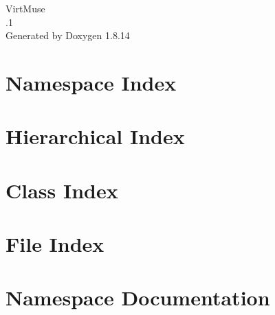 \documentclass[twoside]{book}
\newcommand{\+}{\discretionary{\mbox{\scriptsize$\hookleftarrow$}}{}{}}
\newcommand{\clearemptydoublepage}{%
  \newpage{\pagestyle{empty}\cleardoublepage}%
}
\begin{document}
\hypersetup{pageanchor=false,
             bookmarksnumbered=true,
             pdfencoding=unicode
            }
\begin{titlepage}
\vspace*{7cm}
\begin{center}%
{\Large Virt\+Muse \\[1ex]\large .1 }\\
\vspace*{1cm}
{\large Generated by Doxygen 1.8.14}\\
\end{center}
\end{titlepage}
\clearemptydoublepage
{}
\tableofcontents
\clearemptydoublepage
{}
\hypersetup{pageanchor=true}

\chapter{Namespace Index}

\chapter{Hierarchical Index}

\chapter{Class Index}

\chapter{File Index}

\chapter{Namespace Documentation}



\end{document}

